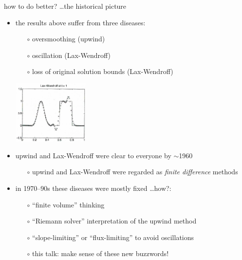 \documentclass[10pt,hyperref,dvipsnames]{beamer}
\begin{document}
\begin{frame}{how to do better? \dots the historical picture}

\begin{itemize}
\item the results above suffer from three diseases:
    \begin{itemize}
    \item[$\circ$] \alert{oversmoothing} (upwind)
    \item[$\circ$] \alert{oscillation} (Lax-Wendroff)
    \item[$\circ$] \alert{loss of original solution bounds} (Lax-Wendroff)
    \end{itemize}

\vspace{-15mm}

\hfill \includegraphics[width=0.3\textwidth]{figs/leveque6p1lw}

\bigskip
\item upwind and Lax-Wendroff were clear to everyone by $\sim$1960
    \begin{itemize}
    \item[$\circ$] upwind and Lax-Wendroff were regarded as \emph{finite difference} methods
    \end{itemize}
\item in 1970--90s these diseases were mostly fixed \dots how?:
    \begin{itemize}
    \item[$\circ$] ``finite volume'' thinking
    \item[$\circ$] ``Riemann solver'' interpretation of the upwind method
    \item[$\circ$] ``slope-limiting'' or ``flux-limiting'' to avoid oscillations
    \item[$\circ$] this talk: make sense of these new buzzwords!
    \end{itemize}
\end{itemize}
\end{frame}
\end{document}
